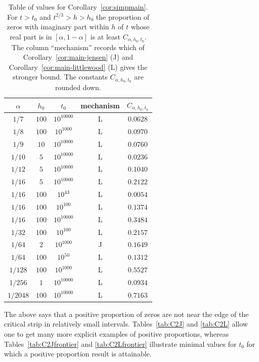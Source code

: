\documentclass[10pt,english,letter, reqno]{amsart}
\theoremstyle{plain}
\theoremstyle{definition}
\begin{document}
\begin{table}[h]
\caption{Table of values for Corollary~\ref{cor:simpmain}. For $t>t_0$ and $t^{2/3}>h>h_0$ the proportion of zeros with imaginary part within $h$ of $t$ whose real part is in $[\alpha,1-\alpha]$ is
at least $C_{\alpha,h_0,t_0}$. The column ``mechanism'' records which of Corollary~\ref{cor:main-jensen} (J) and Corollary~\ref{cor:main-littlewood} (L) gives the stronger bound. The constants $C_{\alpha,h_0,t_0}$ are rounded down.}\label{table:chat}
\begin{tabular}{|ccc|cc|}
\hline
$\alpha$&$h_0$&$t_0$& mechanism & $C_{\alpha,h_0,t_0}$ \\
\hline
$1/7$&$100$&$10^{10000}$&L&$0.0628$\\
$1/8$&$100$&$10^{1000}$&L&$0.0970$\\
$1/9$&$10$&$10^{10000}$&L&$0.0760$\\
$1/10$&$5$&$10^{10000}$&L&$0.0236$\\
$1/12$&$5$&$10^{10000}$&L&$0.1040$\\
$1/16$&$5$&$10^{10000}$&L&$0.2122$\\
$1/16$&$100$&$10^{43}$&L&$0.0054$\\
$1/16$&$100$&$10^{100}$&L&$0.1374$\\
$1/16$&$100$&$10^{10000}$&L&$0.3484$\\
$1/32$&$100$&$10^{100}$&L&$0.2157$\\
$1/64$&$2$&$10^{1000}$&J&$0.1649$\\
$1/64$&$100$&$10^{50}$&L&$0.1312$\\
$1/128$&$100$&$10^{1000}$&L&$0.5527$\\
$1/256$&$1$&$10^{10000}$&L&$0.0934$\\
$1/2048$&$100$&$10^{10000}$&L&$0.7163$\\
\hline
\end{tabular}
\end{table}
The above says that a positive proportion of zeros are not near the edge of the critical strip in relatively small intervals.
Tables~\ref{tab:C2J} and \ref{tab:C2L} allow one to get many more explicit examples of positive proportions, whereas Tables~\ref{tab:C2Jfrontier} and \ref{tab:C2Lfrontier} illustrate minimal values for $t_0$ for which a positive proportion result is attainable.
\end{document}
